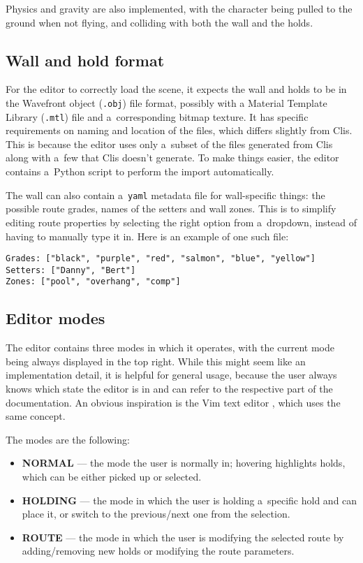 Physics and gravity are also implemented, with the character being pulled to the ground when not flying, and colliding with both the wall and the holds.

\subsection{Wall and hold format}
For the editor to correctly load the scene, it expects the wall and holds to be in the Wavefront object (\verb|.obj|) file format, possibly with a Material Template Library (\verb|.mtl|) file and a~corresponding bitmap texture.
It has specific requirements on naming and location of the files, which differs slightly from Clis.
This is because the editor uses only a~subset of the files generated from Clis along with a~few that Clis doesn't generate.
To make things easier, the editor contains a~Python script to perform the import automatically.

The wall can also contain a~\verb|yaml| metadata file for wall-specific things: the possible route grades, names of the setters and wall zones.
This is to simplify editing route properties by selecting the right option from a~dropdown, instead of having to manually type it in.
Here is an example of one such file:

\begin{verbatim}
Grades: ["black", "purple", "red", "salmon", "blue", "yellow"]
Setters: ["Danny", "Bert"]
Zones: ["pool", "overhang", "comp"]
\end{verbatim}

\subsection{Editor modes}
The editor contains three modes in which it operates, with the current mode being always displayed in the top right.
While this might seem like an implementation detail, it is helpful for general usage, because the user always knows which state the editor is in and can refer to the respective part of the documentation.
An obvious inspiration is the Vim text editor \cite{vim}, which uses the same concept.

The modes are the following:

\begin{itemize}
	\item \textbf{NORMAL} --- the mode the user is normally in; hovering highlights holds, which can be either picked up or selected.
	\item \textbf{HOLDING} --- the mode in which the user is holding a~specific hold and can place it, or switch to the previous/next one from the selection.
	\item \textbf{ROUTE} --- the mode in which the user is modifying the selected route by adding/removing new holds or modifying the route parameters.
\end{itemize}


